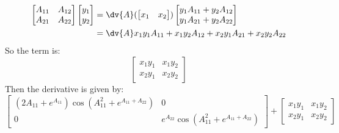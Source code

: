 \documentclass{article}
\begin{document}
\begin{answer}
\begin{align*}
\begin{bmatrix}
                    A_{11} & A_{12} \\
                    A_{21} & A_{22}   
                \end{bmatrix} \begin{bmatrix}
                    y_{1} \\
                    y_{2}   
                \end{bmatrix} &= \dv{A}(\begin{bmatrix}
                    x_{1} & x_{2}   
                \end{bmatrix}) \begin{bmatrix}
                    y_{1}A_{11} + y_{2}A_{12} \\
                    y_{1}A_{21} + y_{2}A_{22} 
                \end{bmatrix} \\
                &= \dv{A} x_{1}y_{1}A_{11} + x_{1}y_{2}A_{12} + x_{2}y_{1}A_{21} + x_{2}y_{2}A_{22}
            \end{align*}
        So the term is:
            \begin{equation*}
                \begin{bmatrix}
                    x_{1}y_{1} & x_{1}y_{2} \\
                    x_{2}y_{1} & x_{2}y_{2}   
                \end{bmatrix}
            \end{equation*}
        Then the derivative is given by:
            \begin{equation*}
                \begin{bmatrix}
                    (2A_{11} + e^{A_{11}})\cos{(A_{11}^{2} + e^{A_{11} + A_{22}})} & 0                                                  \\
                    0                                                            & e^{A_{22}}\cos{(A_{11}^{2} + e^{A_{11} + A_{22}})} 
                \end{bmatrix} +
                \begin{bmatrix}
                    x_{1}y_{1} & x_{1}y_{2} \\
                    x_{2}y_{1} & x_{2}y_{2}   
                \end{bmatrix}
            \end{equation*}
    \end{answer}
\end{document}
